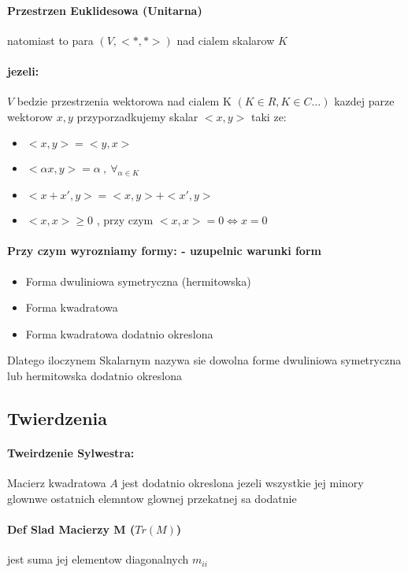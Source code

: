 \documentclass[a4paper]{article}
\begin{document}
\paragraph{Przestrzen Euklidesowa (Unitarna)}
natomiast to para $(V,<*,*>)$ nad cialem skalarow $K$
\paragraph{jezeli:} $V$ bedzie przestrzenia wektorowa nad cialem K $(K \in R , K \in C \ldots)$ kazdej parze wektorow $x, y$ przyporzadkujemy skalar $< x, y >$ taki ze:
\begin{itemize}
    \item $ <x, y > = <y,x> $
    \item $ < \alpha x, y> = \alpha \ , \ \forall_{\alpha \in K} $
    \item $ <x + x', y> = <x,y> + <x' , y>$
    \item $<x,x> \ge 0$ , przy czym $<x,x> = 0 \Leftrightarrow x = 0$
\end{itemize}

\paragraph{Przy czym wyrozniamy formy: - uzupelnic warunki form}
\begin{itemize}
    \item Forma dwuliniowa symetryczna (hermitowska)
    \item Forma kwadratowa
    \item Forma kwadratowa dodatnio okreslona
\end{itemize}
Dlatego iloczynem Skalarnym nazywa sie dowolna forme dwuliniowa symetryczna lub hermitowska dodatnio okreslona
\subsection{Twierdzenia}
\paragraph{Tweirdzenie Sylwestra:}Macierz kwadratowa $A$ jest dodatnio okreslona jezeli wszystkie jej minory glownwe ostatnich elemntow glownej przekatnej sa dodatnie

\paragraph{Def Slad Macierzy M ($Tr(M)$)} jest suma jej elementow diagonalnych $m_{ii}$
\end{document}
